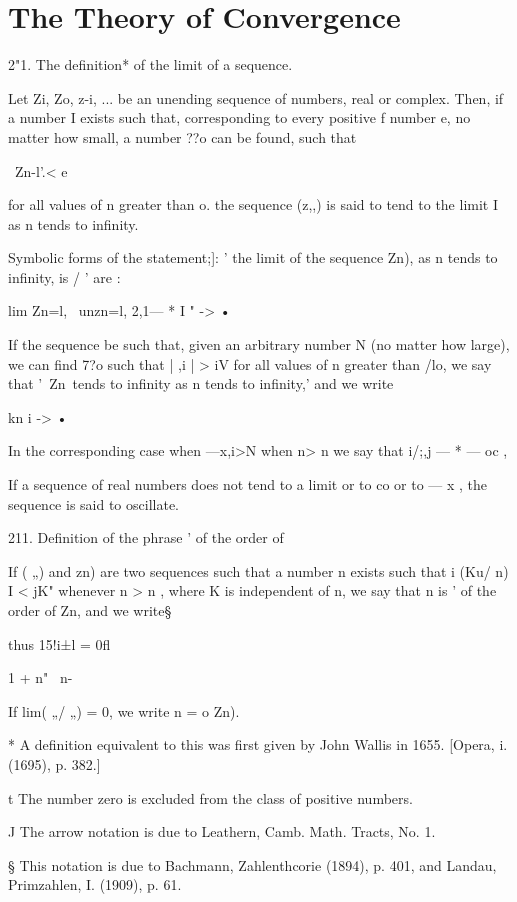 \chapter{The Theory of Convergence} 

2"1. The definition* of the limit of a sequence. 

Let Zi, Zo, z-i, ... be an unending sequence of numbers, real or complex. 
Then, if a number I exists such that, corresponding to every positive f 
number e, no matter how small, a number ??o can be found, such that 

\ Zn-l'.< e 

for all values of n greater than  o. the sequence (z,,) is said to tend to the limit I 
as n tends to infinity. 

Symbolic forms of the statement;]: ' the limit of the sequence  Zn), as n 
tends to infinity, is / ' are : 

lim Zn=l, \ unzn=l, 2,1— * I   "   ->   • 

If the sequence be such that, given an arbitrary number N (no matter 
how large), we can find 7?o such that |  ,i | > iV for all values of n greater than 
/lo, we say that '\ Zn\ tends to infinity as n tends to infinity,' and we write 

kn i ->   • 

In the corresponding case when —x,i>N when n> n  we say that 
i/;,j — * — oc , 

If a sequence of real numbers does not tend to a limit or to co or to — x , 
the sequence is said to oscillate. 

211. Definition of the phrase ' of the order of 

If ( „) and  zn) are two sequences such that a number n  exists such that 
i (Ku/ n) I < jK" whenever n > n , where K is independent of n, we say that  n is 
' of the order of Zn, and we write§ 

thus 15!i±l  = 0fl 

1 + n"  \ n- 

If lim( „/ „) = 0, we write  n = o Zn). 

* A definition equivalent to this was first given by John Wallis in 1655. [Opera, i. (1695), 
p. 382.] 

t The number zero is excluded from the class of positive numbers. 

J The arrow notation is due to Leathern, Camb. Math. Tracts, No. 1. 

§ This notation is due to Bachmann, Zahlenthcorie (1894), p. 401, and Landau, Primzahlen, 
I. (1909), p. 61. 



